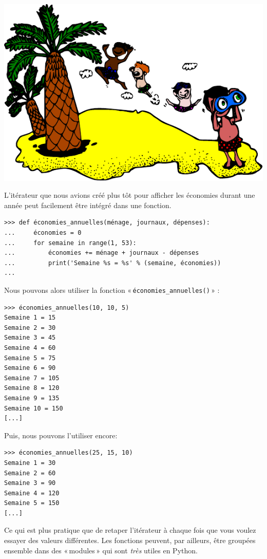 \begin{center}
 \includegraphics{images/ile.pdf}
\end{center}

L'itérateur que nous avions créé plus tôt pour afficher les économies durant une année peut facilement être intégré dans une fonction.

\begin{Verbatim}[frame=single,rulecolor=\color{mbleu}, label=à taper]
>>> def économies_annuelles(ménage, journaux, dépenses):
...     économies = 0
...     for semaine in range(1, 53):
...         économies += ménage + journaux - dépenses
...         print('Semaine %s = %s' % (semaine, économies))
...
\end{Verbatim}

Nous pouvons alors utiliser la fonction « \texttt{économies\_annuelles()} » :

\begin{Verbatim}[frame=single,rulecolor=\color{mbleu}, label=à taper]
>>> économies_annuelles(10, 10, 5)
Semaine 1 = 15
Semaine 2 = 30
Semaine 3 = 45
Semaine 4 = 60
Semaine 5 = 75
Semaine 6 = 90
Semaine 7 = 105
Semaine 8 = 120
Semaine 9 = 135
Semaine 10 = 150
[...]
\end{Verbatim}

Puis, nous pouvons l'utiliser encore:

\begin{Verbatim}[frame=single,rulecolor=\color{mbleu}, label=à taper]
>>> économies_annuelles(25, 15, 10)
Semaine 1 = 30
Semaine 2 = 60
Semaine 3 = 90
Semaine 4 = 120
Semaine 5 = 150
[...]
\end{Verbatim}

Ce qui est plus pratique que de retaper l'itérateur à chaque fois que vous voulez essayer des valeurs différentes.
Les fonctions peuvent, par ailleurs, être groupées ensemble dans des « modules »  qui sont \emph{très} utiles en Python.\\

